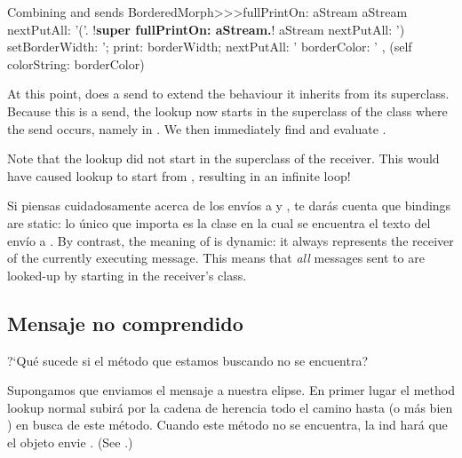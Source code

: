 \documentclass[a4paper,10pt,twoside]{book}
\begin{document}

\begin{method}[fullPrintOn]{Combining \super and \self sends}
BorderedMorph>>>fullPrintOn: aStream
	aStream nextPutAll: '('.
	!\textbf{super fullPrintOn: aStream.}!
	aStream nextPutAll: ') setBorderWidth: '; print: borderWidth;
		nextPutAll: ' borderColor: ' , (self colorString: borderColor)
\end{method}
At this point,  does a \super send to extend the 
 behaviour it inherits from its superclass.
Because this is a \super send, the lookup now starts in the superclass of the class where the \super send occurs, namely in .
We then immediately find and evaluate .

Note that the \super lookup did not start in the superclass of the receiver.
This would have caused lookup to start from , resulting in an infinite loop!


Si piensas cuidadosamente acerca de los env\'ios a \super y , te dar\'as cuenta que \super bindings are static: lo \'unico que importa es la clase en la cual se encuentra el texto del env\'io a \super.
By contrast, the meaning of \self is dynamic: it always represents the receiver of the currently executing message. This means that  \emph{all}  messages sent to \self are looked-up by starting in the receiver's class.

\subsection{Mensaje no comprendido}

?`Qu\'e sucede si el m\'etodo que estamos buscando no se encuentra?

Supongamos que enviamos el mensaje  a nuestra elipse.
En primer lugar el method lookup normal subir\'a por la cadena de herencia todo el camino hasta  (o m\'as bien ) en busca de este m\'etodo.
Cuando este m\'etodo no se encuentra, la ind  har\'a que el objeto envie .
(See .)
\end{document}

